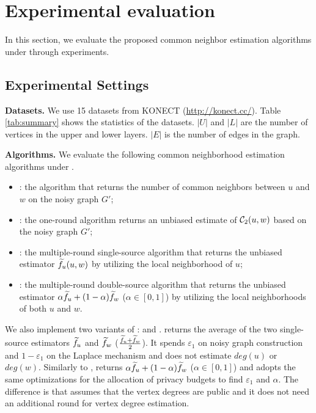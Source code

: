 \section{Experimental evaluation}
\label{sec:exp}

In this section, we evaluate the proposed common neighbor estimation algorithms under \epldp through experiments. 

\subsection{Experimental Settings}


\noindent
{\bf Datasets.}
We use 15 datasets from KONECT ({\url{http://konect.cc/}}). 
Table \ref{tab:summary} shows the statistics of the datasets. 
$|U|$ and $|L|$ are the number of vertices in the upper and lower layers. $|E|$ is the number of edges in the graph. 

\noindent
{\bf Algorithms.} 
We evaluate the following common neighborhood estimation algorithms under \epldp. 
\begin{itemize}
    \item \naive: the algorithm that returns the number of common neighbors between $u$ and $w$ on the noisy graph $G'$;
    \item \bs: the one-round algorithm returns an unbiased estimate of $\mathcal{C}_2(u,w)$ based on the noisy graph $G'$;
    \item \advss: the multiple-round single-source algorithm that returns the unbiased estimator $\widetilde{f}_u(u,w)$ by utilizing the local neighborhood of $u$;     
    \item \advds: the multiple-round double-source algorithm that returns the unbiased estimator $ \alpha \widetilde{f}_u + (1 - \alpha) \widetilde{f}_w$ ($\alpha \in [0,1]$) by utilizing the local neighborhoods of both $u$ and $w$.
\end{itemize}
{We also implement two variants of \advds: \advdsbasic and \advdeg. 
\advdsbasic returns the average of the two single-source estimators $\widetilde{f}_u$ and $\widetilde{f}_w$ ($ \frac{\widetilde{f}_u +\widetilde{f}_w}{2}$). It spends $\varepsilon_1$ on noisy graph construction and $1 - \varepsilon_1$ on the Laplace mechanism and does not estimate $deg(u)$ or $deg(w)$. 
Similarly to \advds, \advdeg returns $ \alpha \widetilde{f}_u + (1 - \alpha) \widetilde{f}_w$ ($\alpha \in [0,1]$) and adopts the same optimizations for the allocation of privacy budgets to find $\varepsilon_1$ and $\alpha$. 
The difference is that \advdeg assumes that the vertex degrees are public and it does not need an additional round for vertex degree estimation. }

